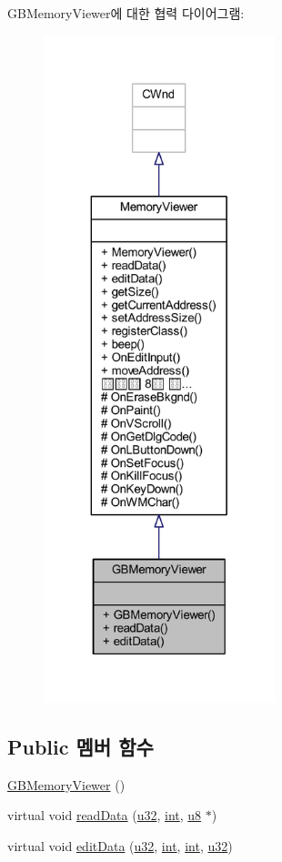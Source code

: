 G\+B\+Memory\+Viewer에 대한 협력 다이어그램\+:\nopagebreak
\begin{figure}[H]
\begin{center}
\leavevmode
\includegraphics[height=550pt]{class_g_b_memory_viewer__coll__graph}
\end{center}
\end{figure}
\subsection*{Public 멤버 함수}
\begin{DoxyCompactItemize}
\item 
\mbox{\hyperlink{class_g_b_memory_viewer_a5a01f4c525ddefc77be187179f7358f1}{G\+B\+Memory\+Viewer}} ()
\item 
virtual void \mbox{\hyperlink{class_g_b_memory_viewer_a9feb85c84ffef853cad4139ea8c3c567}{read\+Data}} (\mbox{\hyperlink{_system_8h_a10e94b422ef0c20dcdec20d31a1f5049}{u32}}, \mbox{\hyperlink{_util_8cpp_a0ef32aa8672df19503a49fab2d0c8071}{int}}, \mbox{\hyperlink{_system_8h_aed742c436da53c1080638ce6ef7d13de}{u8}} $\ast$)
\item 
virtual void \mbox{\hyperlink{class_g_b_memory_viewer_ada4ac6d60aab7d4169b8809cf7fe7e1e}{edit\+Data}} (\mbox{\hyperlink{_system_8h_a10e94b422ef0c20dcdec20d31a1f5049}{u32}}, \mbox{\hyperlink{_util_8cpp_a0ef32aa8672df19503a49fab2d0c8071}{int}}, \mbox{\hyperlink{_util_8cpp_a0ef32aa8672df19503a49fab2d0c8071}{int}}, \mbox{\hyperlink{_system_8h_a10e94b422ef0c20dcdec20d31a1f5049}{u32}})
\end{DoxyCompactItemize}
